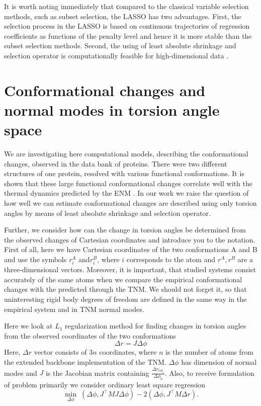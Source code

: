 \documentclass[12pt,twoside]{article}
\begin{document}
  It is worth noting immediately that сompared to the classical variable selection methods, such as subset selection, the LASSO has two advantages. First, the selection process in the LASSO is based on continuous trajectories of regression coefficients as functions of the penalty level and hence it is more stable than the subset selection methods. Second, the using of least absolute shrinkage and selection operator is computationally feasible for high-dimensional data\cite{tibshirani1996regression,RePEc:eee:jmvana:v:132:y:2014:i:C:p:138-150,oai:CiteSeerPSU:302091} .


 \section{Conformational changes and normal modes in torsion angle space}
 We are investigating here computational models, describing the conformational changes, observed in the data bank of proteins. There were two different structures of one protein, resolved with various functional conformations. It is shown that these large functional conformational changes correlate well with the thermal dynamics predicted by the ENM \cite{pmid:11287673, pmid:21826755, pmid:23429178}. In our work we raise the question of how well we can estimate conformational changes are described using only torsion angles by means of least absolute shrinkage and selection operator. 


Further, we consider how can the change in torsion angles be determined from the observed changes of Cartesian coordinates and introduce you to the notation. First of all, here we have Cartesian coordinates of the two conformations A and B and use the symbols $r_i^A$ and$ r_i^B$, where $i$ corresponds to the atom and $r^A, r^B$ are a three-dimensional vectors. Moreover, it is important, that studied systems consist accurately of the same atoms when we compare the empirical conformational changes with the predicted through the TNM. We should not forget it, so that uninteresting rigid body degrees of freedom are defined in the same way in the empirical system and in TNM normal modes. 

Here we look at $L_1$ regularization method for finding changes in torsion angles from the observed coordinates of the two conformations 
$$\Delta r = J \Delta \phi$$
Here, $\Delta r$ vector consists of $3n$ coordinates, where $n$ is the number of atoms from the extended backbone implementation of the TNM.  $\Delta \phi$ has dimension of normal modes and $J$ is  the Jacobian matrix containing $\frac{\Delta r_{int_i}}{\Delta \phi_a}$.  Also, to receive formulation of problem primarily we consider ordinary least square regression
$$\min_{\Delta \phi} \; (\Delta \phi, J^{\top}MJ \Delta \phi)-2(\Delta \phi, J^{\top}M\Delta r).$$
\end{document}
